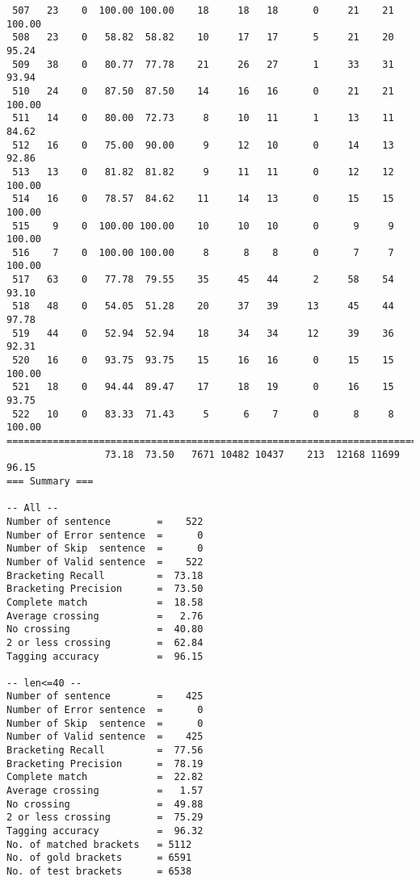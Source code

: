 \begin{verbatim}
 507   23    0  100.00 100.00    18     18   18      0     21    21   100.00
 508   23    0   58.82  58.82    10     17   17      5     21    20    95.24
 509   38    0   80.77  77.78    21     26   27      1     33    31    93.94
 510   24    0   87.50  87.50    14     16   16      0     21    21   100.00
 511   14    0   80.00  72.73     8     10   11      1     13    11    84.62
 512   16    0   75.00  90.00     9     12   10      0     14    13    92.86
 513   13    0   81.82  81.82     9     11   11      0     12    12   100.00
 514   16    0   78.57  84.62    11     14   13      0     15    15   100.00
 515    9    0  100.00 100.00    10     10   10      0      9     9   100.00
 516    7    0  100.00 100.00     8      8    8      0      7     7   100.00
 517   63    0   77.78  79.55    35     45   44      2     58    54    93.10
 518   48    0   54.05  51.28    20     37   39     13     45    44    97.78
 519   44    0   52.94  52.94    18     34   34     12     39    36    92.31
 520   16    0   93.75  93.75    15     16   16      0     15    15   100.00
 521   18    0   94.44  89.47    17     18   19      0     16    15    93.75
 522   10    0   83.33  71.43     5      6    7      0      8     8   100.00
============================================================================
                 73.18  73.50   7671 10482 10437    213  12168 11699    96.15
=== Summary ===

-- All --
Number of sentence        =    522
Number of Error sentence  =      0
Number of Skip  sentence  =      0
Number of Valid sentence  =    522
Bracketing Recall         =  73.18
Bracketing Precision      =  73.50
Complete match            =  18.58
Average crossing          =   2.76
No crossing               =  40.80
2 or less crossing        =  62.84
Tagging accuracy          =  96.15

-- len<=40 --
Number of sentence        =    425
Number of Error sentence  =      0
Number of Skip  sentence  =      0
Number of Valid sentence  =    425
Bracketing Recall         =  77.56
Bracketing Precision      =  78.19
Complete match            =  22.82
Average crossing          =   1.57
No crossing               =  49.88
2 or less crossing        =  75.29
Tagging accuracy          =  96.32
No. of matched brackets   = 5112
No. of gold brackets      = 6591
No. of test brackets      = 6538

\end{verbatim}

\normalsize

